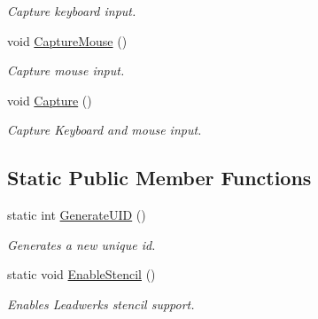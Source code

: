 \begin{DoxyCompactItemize}
\begin{DoxyCompactList}\small\item\em Capture keyboard input. \end{DoxyCompactList}\item 
\hypertarget{class_u_i_system_a9139946c67db84d93b4a23a42a51eea1}{void \hyperlink{class_u_i_system_a9139946c67db84d93b4a23a42a51eea1}{Capture\-Mouse} ()}\label{class_u_i_system_a9139946c67db84d93b4a23a42a51eea1}

\begin{DoxyCompactList}\small\item\em Capture mouse input. \end{DoxyCompactList}\item 
\hypertarget{class_u_i_system_a29ac5727af1a979e24f4e8a92ff7a5a3}{void \hyperlink{class_u_i_system_a29ac5727af1a979e24f4e8a92ff7a5a3}{Capture} ()}\label{class_u_i_system_a29ac5727af1a979e24f4e8a92ff7a5a3}

\begin{DoxyCompactList}\small\item\em Capture Keyboard and mouse input. \end{DoxyCompactList}\end{DoxyCompactItemize}
\subsection*{Static Public Member Functions}
\begin{DoxyCompactItemize}
\item 
static int \hyperlink{class_u_i_system_a5735f001450f7ecd82a4de76558640c6}{Generate\-U\-I\-D} ()
\begin{DoxyCompactList}\small\item\em Generates a new unique id. \end{DoxyCompactList}\item 
static void \hyperlink{class_u_i_system_ac99ba6fff41b063161c3aaad85e6e1f4}{Enable\-Stencil} ()
\begin{DoxyCompactList}\small\item\em Enables Leadwerks stencil support. \end{DoxyCompactList}\end{DoxyCompactItemize}
